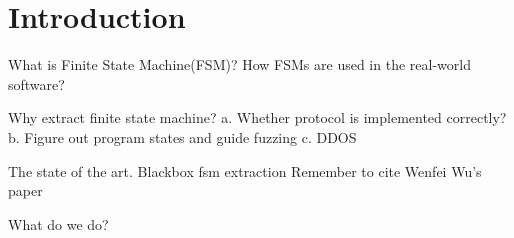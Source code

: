 \section{Introduction}
What is Finite State Machine(FSM)? 
How FSMs are used in the real-world software?

Why extract finite state machine? 
a. Whether protocol is implemented correctly?
b. Figure out program states and guide fuzzing
c. DDOS

The state of the art. 
Blackbox fsm extraction 
Remember to cite Wenfei Wu’s paper

What do we do? 


